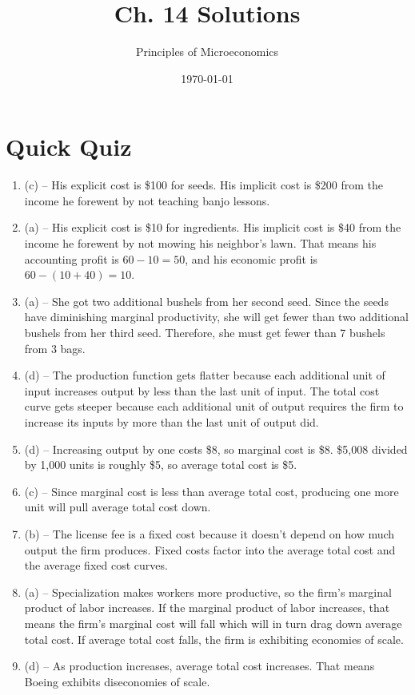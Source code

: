 \documentclass{article}
\title{Ch. 14 Solutions}
\author{Principles of Microeconomics}
\date{\today}
\begin{document}
\maketitle

\section*{Quick Quiz}

\begin{enumerate}

\item (c) -- His explicit cost is \$100 for seeds. His implicit cost is \$200 from the income he forewent by not teaching banjo lessons.

\item (a) -- His explicit cost is \$10 for ingredients. His implicit cost is \$40 from the income he forewent by not mowing his neighbor's lawn. That means his accounting profit is $60 - 10 = 50$, and his economic profit is $60 - (10 + 40) = 10$. 

\item (a) -- She got two additional bushels from her second seed. Since the seeds have diminishing marginal productivity, she will get fewer than two additional bushels from her third seed. Therefore, she must get fewer than 7 bushels from 3 bags. 

\item (d) -- The production function gets flatter because each additional unit of input increases output by less than the last unit of input. The total cost curve gets steeper because each additional unit of output requires the firm to increase its inputs by more than the last unit of output did. 

\item (d) -- Increasing output by one costs \$8, so marginal cost is \$8. \$5,008 divided by 1,000 units is roughly \$5, so average total cost is \$5.

\item (c) -- Since marginal cost is less than average total cost, producing one more unit will pull average total cost down.

\item (b) -- The license fee is a fixed cost because it doesn't depend on how much output the firm produces. Fixed costs factor into the average total cost and the average fixed cost curves. 

\item (a) -- Specialization makes workers more productive, so the firm's marginal product of labor increases. If the marginal product of labor increases, that means the firm's marginal cost will fall which will in turn drag down average total cost. If average total cost falls, the firm is exhibiting economies of scale.

\item (d) -- As production increases, average total cost increases. That means Boeing exhibits diseconomies of scale. 

\end{enumerate}
\end{document}
